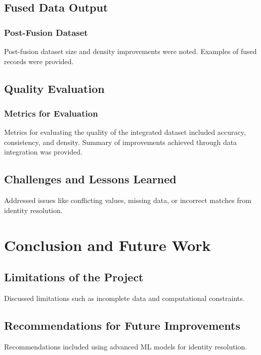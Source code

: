 \documentclass[runningheads]{llncs}
\begin{document}
\subsection{Fused Data Output}
\subsubsection{Post-Fusion Dataset}
Post-fusion dataset size and density improvements were noted. Examples of fused records were provided.

\subsection{Quality Evaluation}
\subsubsection{Metrics for Evaluation}
Metrics for evaluating the quality of the integrated dataset included accuracy, consistency, and density. Summary of improvements achieved through data integration was provided.

\subsection{Challenges and Lessons Learned}
Addressed issues like conflicting values, missing data, or incorrect matches from identity resolution.

\section{Conclusion and Future Work}
\subsection{Limitations of the Project}
Discussed limitations such as incomplete data and computational constraints.

\subsection{Recommendations for Future Improvements}
Recommendations included using advanced ML models for identity resolution.


 
\end{document}
